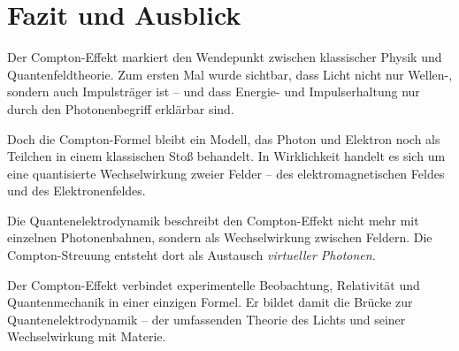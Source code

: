 \section{Fazit und Ausblick}

Der Compton-Effekt markiert den Wendepunkt zwischen klassischer Physik und Quantenfeldtheorie.
Zum ersten Mal wurde sichtbar, dass Licht nicht nur Wellen-, sondern auch Impulsträger ist –
und dass Energie- und Impulserhaltung nur durch den Photonenbegriff erklärbar sind.

Doch die Compton-Formel bleibt ein Modell, das Photon und Elektron
noch als Teilchen in einem klassischen Stoß behandelt.
In Wirklichkeit handelt es sich um eine quantisierte Wechselwirkung
zweier Felder – des elektromagnetischen Feldes und des Elektronenfeldes.

\begin{DidaktikBox}
	Die Quantenelektrodynamik beschreibt den Compton-Effekt
	nicht mehr mit einzelnen Photonenbahnen, sondern
	als Wechselwirkung zwischen Feldern.
	Die Compton-Streuung entsteht dort als Austausch \emph{virtueller Photonen}.
\end{DidaktikBox}

Der Compton-Effekt verbindet experimentelle Beobachtung,
Relativität und Quantenmechanik in einer einzigen Formel.
Er bildet damit die Brücke zur Quantenelektrodynamik –
der umfassenden Theorie des Lichts und seiner Wechselwirkung mit Materie.
